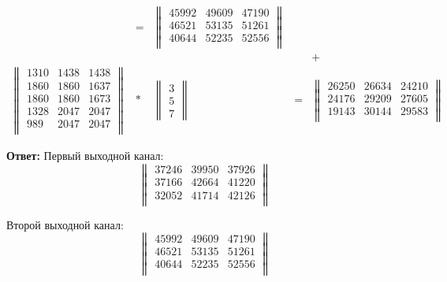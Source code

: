 \documentclass[12pt, a4paper]{extarticle}
\newcommand{\Answer}[1]{\textbf{Ответ:} #1 \\}
\begin{document}
\begin{enumerate}
\begin{equation}
\begin{array}{rcccccc}
            & = &
            \begin{Vmatrix}
                45992 & 49609 & 47190 \\
                46521 & 53135 & 51261 \\
                40644 & 52235 & 52556 \\
            \end{Vmatrix} \\
            & & & & + & & \\
            \begin{Vmatrix}
                1310 & 1438 & 1438 \\
                1860 & 1860 & 1637 \\
                1860 & 1860 & 1673 \\
                1328 & 2047 & 2047 \\
                989 & 2047 & 2047 \\
            \end{Vmatrix}
            & \ast & 
            \begin{Vmatrix}
                3 \\ 5 \\ 7
            \end{Vmatrix} 
            & = &
            \begin{Vmatrix}
                26250 & 26634 & 24210 \\
                24176 & 29209 & 27605 \\
                19143 & 30144 & 29583 \\
            \end{Vmatrix} & & 
        \end{array}
        \end{equation}
\end{enumerate}

\Answer{Первый выходной канал:
    \begin{equation*}
        \begin{Vmatrix}
            37246 & 39950 & 37926 \\
            37166 & 42664 & 41220 \\
            32052 & 41714 & 42126 \\
        \end{Vmatrix}
    \end{equation*}
    
    Второй выходной канал:
    \begin{equation*}
        \begin{Vmatrix}
            45992 & 49609 & 47190 \\
            46521 & 53135 & 51261 \\
            40644 & 52235 & 52556 \\
        \end{Vmatrix}
    \end{equation*}
}
\end{document}
